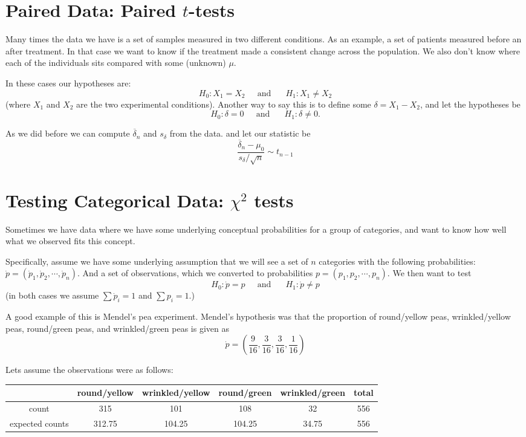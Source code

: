 \section{Paired Data: Paired $t$-tests}
Many times the data we have is a set of samples measured in two different conditions. 
As an example, a set of patients measured before an after treatment. 
In that case we want to know if the treatment made a consistent change across the population. 
We also don't know where each of the individuals sits compared with some (unknown) $\mu$. 

In these cases our hypotheses are: 
\[H_0: X_1 = X_2 \;\;\;\;\text{ and }\;\;\;\;\;H_1: X_1\ne X_2\]
(where $X_1$ and $X_2$ are the two experimental conditions). 
Another way to say this is to define some $\delta=X_1-X_2$, and let the hypotheses be 
\[H_0: \delta=0 \;\;\;\;\text{ and }\;\;\;\;\;H_1: \delta \ne 0.\]

As we did before we can compute $\overline{\delta}_n$ and $s_\delta$ from the data. 
and let our statistic be 
\[\frac{\overline{\delta}_n-\mu_0}{s_\delta/\sqrt{n}}\sim t_{n-1}\]


\section{Testing Categorical Data: $\chi^2$ tests}
Sometimes we have data where we have some underlying conceptual probabilities for a group of categories, 
and want to know how well what we observed fits this concept. 

Specifically, assume we have some underlying assumption that we will see a set of $n$ categories with the following probabilities:
$\dot{p} = (\dot{p}_1, \dot{p}_2, \cdots, \dot{p}_n)$. 
And a set of observations, which we converted to probabilities ${p} = ({p}_1, {p}_2, \cdots, {p}_n)$.
We then want to test  
\[H_0: \dot{p}=p \;\;\;\;\text{ and }\;\;\;\;\;H_1: \dot{p} \ne p\]
(in both cases we assume $\sum \dot{p}_i=1$ and $\sum p_i =1$.)

A good example of this is Mendel’s pea experiment. Mendel’s hypothesis was that the
proportion of round/yellow peas, wrinkled/yellow peas,
round/green peas, and wrinkled/green peas is given as
\[\dot{p} = \left(\frac{9}{16},\frac{3}{16},\frac{3}{16},\frac{1}{16}\right)\]

Lets assume the observations were as follows: 
\begin{center}
\begin{tabular}{|c|c|c|c|c||c|}
\hline
&round/yellow & wrinkled/yellow & round/green & wrinkled/green & total\\
\hline\hline
count & 315 & 101 & 108 & 32 & 556\\
expected counts& 312.75 & 104.25 & 104.25 & 34.75 & 556\\
\hline 
\end{tabular}
\end{center}

